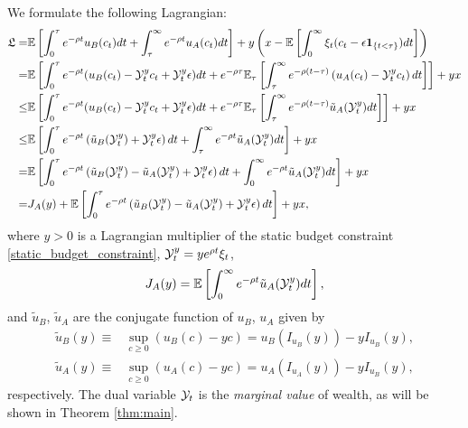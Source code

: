 \documentclass[a4paper,report, 11pt]{article}
\def\e{\epsilon}
\def\be{\begin{eqnarray}}
\def\ee{\end{eqnarray}}
\begin{document}
We  formulate the following Lagrangian: 
\begin{eqnarray}
\begin{split}\label{eq:Lagrangian}
\mathfrak{L}=&\mathbb{E}\left[\int_0^\tau e^{-\rho t} u_B(c_t)dt+\int_\tau^\infty e^{-\rho t}u_A(c_t)dt\right]+y\left(x-\mathbb{E}\left[\int_0^\infty {\xi}_t (c_t -\e{\bf 1}_{\{t<\tau\}})dt \right]\right)\\
=&\mathbb{E}\left[\int_0^\tau e^{-\rho t}(u_B(c_t)-{\cal Y}_t^y c_t +{\cal Y}_t^y \e)dt + e^{-\rho \tau}{\mathbb{E}_{\tau}\left[\int_{\tau}^\infty e^{-\rho(t-\tau)}\left(u_A(c_t)-{\cal Y}_t^y c_t\right)dt\right]}\right] +yx \\
\le&\mathbb{E}\left[\int_0^\tau e^{-\rho t}(u_B(c_t)-{\cal Y}_t^y c_t +{\cal Y}_t^y \e)dt + e^{-\rho \tau}{\mathbb{E}_{\tau}\left[\int_{\tau}^\infty e^{-\rho(t-\tau)}\tilde{u}_A({\cal Y}_t^y)dt\right]}\right] +yx \\
\le&\mathbb{E}\left[\int_0^\tau e^{-\rho t}\left(\tilde{u}_B({\cal Y}_t^y )+{\cal Y}_t^y \e\right)dt +\int_\tau^\infty e^{-\rho t}\tilde{u}_A({\cal Y}_t^y)dt\right] +yx\\
=&\mathbb{E}\left[\int_0^\tau e^{-\rho t}\left(\tilde{u}_B({\cal Y}_t^y )-\tilde{u}_A({\cal Y}_t^y)+{\cal Y}_t^y \e\right)dt +\int_0^\infty e^{-\rho t}\tilde{u}_A({\cal Y}_t^y)dt\right] +yx\\
=&J_A(y) + \mathbb{E}\left[\int_0^\tau e^{-\rho t}\left(\tilde{u}_B({\cal Y}_t^y )-\tilde{u}_A({\cal Y}_t^y)+{\cal Y}_t^y \e\right)dt\right] +yx,
\end{split}
\end{eqnarray}
where $y>0$ is a Lagrangian multiplier of the static budget constraint \eqref{static_budget_constraint}, ${\cal Y}_t^y = y e^{\rho t} {\xi}_t$,
\be\label{de:dual_vf_a}
 J_A(y)=\mathbb{E}\left[\int_0^\infty e^{-\rho t}\tilde{u}_A({\cal Y}_t^y)dt\right],
\ee
and $\tilde{u}_B$, $\tilde{u}_A$ are the conjugate function of $u_B$, $u_A$ given by 
	\begin{align*}
	\tilde{u}_B(y)\equiv&\sup_{c\ge 0}\left(u_B(c)-yc\right)=u_B(I_{u_B}(y))-yI_{u_B}(y),\\
	\tilde{u}_A(y)\equiv&\sup_{c\ge 0}\left(u_A(c)-yc\right)=u_A(I_{u_A}(y))-yI_{u_B}(y),
	\end{align*}
respectively. The dual variable ${\cal Y}_t$ is the {\em marginal value} of wealth, as will be shown in Theorem \ref{thm:main}. 
\end{document}
